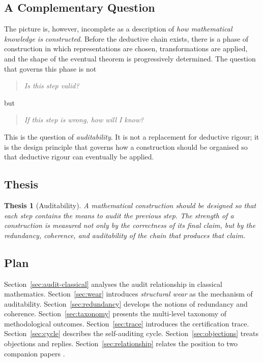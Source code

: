 \documentclass[11pt,a4paper]{article}
\theoremstyle{definition}
\theoremstyle{plain}
\newtheorem{thesis}[definition]{Thesis}
\begin{document}
\subsection{A Complementary Question}

The picture is, however, incomplete as a description of
\emph{how mathematical knowledge is constructed}. Before the
deductive chain exists, there is a phase of construction in which
representations are chosen, transformations are applied, and the
shape of the eventual theorem is progressively determined. The
question that governs this phase is not

\begin{quote}
\emph{Is this step valid?}
\end{quote}

but

\begin{quote}
\emph{If this step is wrong, how will I know?}
\end{quote}

This is the question of \emph{auditability}. It is not a
replacement for deductive rigour; it is the design principle that
governs how a construction should be organised so that deductive
rigour can eventually be applied.

\subsection{Thesis}

\begin{thesis}[Auditability]\label{th:audit}
A mathematical construction should be designed so that each step
contains the means to audit the previous step. The strength of a
construction is measured not only by the correctness of its final
claim, but by the redundancy, coherence, and auditability of the
chain that produces that claim.
\end{thesis}

\subsection{Plan}

Section~\ref{sec:audit-classical} analyses the audit relationship
in classical mathematics. Section~\ref{sec:wear} introduces
\emph{structural wear} as the mechanism of auditability.
Section~\ref{sec:redundancy} develops the notions of redundancy and
coherence. Section~\ref{sec:taxonomy} presents the multi-level
taxonomy of methodological outcomes. Section~\ref{sec:trace}
introduces the certification trace.
Section~\ref{sec:cycle} describes the self-auditing cycle.
Section~\ref{sec:objections} treats objections and replies.
Section~\ref{sec:relationship} relates the position to two
companion papers \cite{paperI,paperII}.
\end{document}
